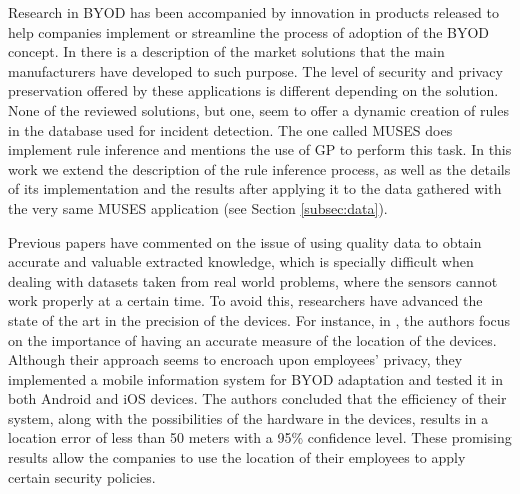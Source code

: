 \documentclass[a4paper,10pt,twocolumn,preprint,3p]{elsarticle}
\begin{document}
Research in BYOD has been accompanied by innovation in products released
to help companies implement or streamline the process of adoption of the BYOD
concept. In \cite{de2015corporate} there is a description of the
market solutions that the main manufacturers have developed to such
purpose. The level of security and privacy preservation offered by
these applications is different depending on the solution.
None of the reviewed solutions, but one, seem to offer a dynamic
creation of rules in the database used for incident detection. The one
called MUSES does implement rule inference and mentions the use of GP
to perform this task. In this work we extend the description of the
rule inference process, as well as the details of its implementation
and the results after applying it to the data gathered with the very
same MUSES application (see Section \ref{subsec:data}). 


Previous papers have commented on the issue of using quality data to obtain accurate and valuable extracted knowledge, which is specially difficult when dealing with datasets taken from real world problems, where the sensors cannot work properly at a certain time.
To avoid this, researchers have advanced the state of the art in the precision of the
devices. For instance, in \cite{rios2015mobile}, the authors focus on
the importance of having an accurate measure of the location of the
devices. Although their approach seems to encroach upon employees'
privacy, they implemented a mobile information system for BYOD
adaptation and tested it in both Android and iOS devices. The authors
concluded that the efficiency of their system, along with the
possibilities of the hardware in the devices, results in a location
error of less than 50 meters with a 95\% confidence level. These
promising results allow the companies to use the location of their
employees to apply certain security policies. %

\end{document}
